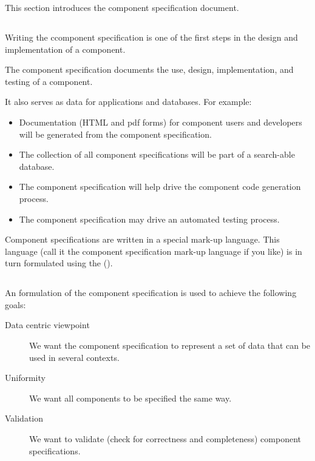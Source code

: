 \documentclass[11pt]{article}
\begin{document}
This section introduces the component specification document.

\subsection{\SUBSECwhySpec}
\label{\SUBSECwhySpec}

Writing the \xml{} ccomponent specification is one of the first steps in the
design and implementation of a component.

The \xml{} component specification documents the use, design,
implementation, and testing of a \sr{} component.  

It also serves as data for applications and databases.  For example:

\begin{itemize}
\item Documentation (HTML and pdf forms) for component users and
  developers will be generated from the component specification.
  
\item The collection of all component specifications will be part of a 
  search-able database.
  
\item The component specification will help drive the component code
  generation process.
  
\item The component specification may drive an automated testing process.
\end{itemize}

Component specifications are written in a special mark-up language.  This
language (call it the component specification mark-up language if you
like) is in turn formulated using the 
(\xml).


\subsection{\SUBSECwhyXml}
\label{\SUBSECwhyXml}

An \xml{} formulation of the component specification is used to achieve
the following goals:

\begin{description}
\item[Data centric viewpoint] We want the component specification to
  represent a set of data that can be used in several contexts.

\item[Uniformity] We want all components to be specified the same way.
  
\item[Validation] We want to validate (check for correctness and
  completeness) component specifications.
\end{description}
\end{document}
